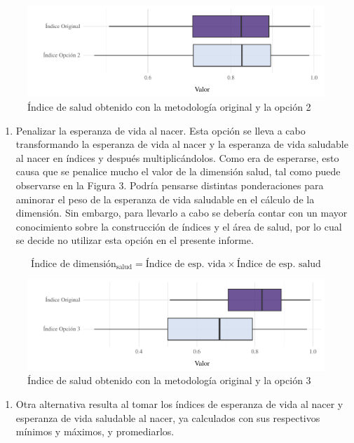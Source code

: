 \documentclass[
  10pt,
]{article}
\providecommand{\tightlist}{%
  \setlength{\itemsep}{0pt}\setlength{\parskip}{0pt}}
\begin{document}
\begin{figure}
\centering
\includegraphics{Informe_files/figure-latex/Figura2-1.pdf}
\caption{Índice de salud obtenido con la metodología original y la
opción 2}
\end{figure}

\begin{enumerate}
\def\labelenumi{\arabic{enumi}.}
\setcounter{enumi}{2}
\tightlist
\item
  Penalizar la esperanza de vida al nacer. Esta opción se lleva a cabo
  transformando la esperanza de vida al nacer y la esperanza de vida
  saludable al nacer en índices y después multiplicándolos. Como era de
  esperarse, esto causa que se penalice mucho el valor de la dimensión
  salud, tal como puede observarse en la Figura 3. Podría pensarse
  distintas ponderaciones para aminorar el peso de la esperanza de vida
  saludable en el cálculo de la dimensión. Sin embargo, para llevarlo a
  cabo se debería contar con un mayor conocimiento sobre la construcción
  de índices y el área de salud, por lo cual se decide no utilizar esta
  opción en el presente informe.
\end{enumerate}

\[\text{Índice de dimensión}_\text{salud}=\text{Índice de esp. vida}\times\text{Índice de esp. salud}\]

\begin{figure}
\centering
\includegraphics{Informe_files/figure-latex/Figura3-1.pdf}
\caption{Índice de salud obtenido con la metodología original y la
opción 3}
\end{figure}

\begin{enumerate}
\def\labelenumi{\arabic{enumi}.}
\setcounter{enumi}{3}
\tightlist
\item
  Otra alternativa resulta al tomar los índices de esperanza de vida al
  nacer y esperanza de vida saludable al nacer, ya calculados con sus
  respectivos mínimos y máximos, y promediarlos.
\end{enumerate}
\end{document}
